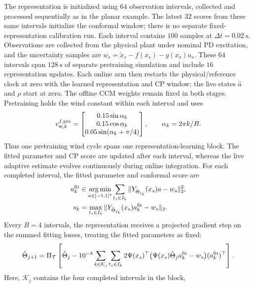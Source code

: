 \documentclass[11pt]{article}
\begin{document}
The representation is initialized using $64$ observation intervals,
collected and processed sequentially as in the planar example. The latest
$32$ scores from these same intervals initialize the conformal window;
there is no separate fixed-representation calibration run. Each interval contains $100$ samples at
$\Delta t=0.02~\mathrm s$. Observations are collected from the physical
plant under nominal PD excitation, and the uncertainty samples are
$w_s=\dot x_s-f(x_s)-g(x_s)u_s$.
These $64$ intervals span $128~\mathrm s$ of separate pretraining
simulation and include $16$ representation updates. Each online arm
then restarts the physical/reference clock at zero with the learned
representation and CP window; the live states $\hat a$ and $\rho$
start at zero. The offline CCM weights remain fixed in both stages.
Pretraining holds the wind constant within each interval and uses
\begin{equation}
    v_{{\rm w},k}^{I,\rm pre}=
      \begin{bmatrix}0.15\sin\alpha_k\\0.15\cos\alpha_k\\
      0.05\sin(\alpha_k+\pi/4)\end{bmatrix},\qquad
    \alpha_k=2\pi k/B.
\end{equation}
Thus one pretraining wind cycle spans one representation-learning block.
The fitted parameter and CP score are updated after each interval, whereas
the live adaptive estimate evolves continuously during online integration.
For each completed interval, the fitted parameter and conformal score are
\begin{equation}\label{eq:quad-score}
\begin{aligned}
    a_k^{\rm fit}&\in\underset{a\in[-1,1]^4}{\arg\min}
        \sum_{t_s\in I_k}\|Y_{\hat\Theta_{j_k}}(x_s)a-w_s\|_2^2,\\
    s_k&=\max_{t_s\in I_k}
        \|Y_{\hat\Theta_{j_k}}(x_s)a_k^{\rm fit}-w_s\|_2.
\end{aligned}
\end{equation}
Every $B=4$ intervals, the representation receives a projected gradient
step on the summed fitting losses, treating the fitted parameters as fixed:
\begin{equation}
    \hat\Theta_{j+1}=\Pi_{\mathcal T}\left[
      \hat\Theta_j-10^{-4}\sum_{k\in\mathcal K_j}\sum_{t_s\in I_k}
      2\Psi(x_s)^\top
      \big(\Psi(x_s)\hat\Theta_j a_k^{\rm fit}-w_s\big)
      (a_k^{\rm fit})^\top\right].
\end{equation}
Here, $\mathcal K_j$ contains the four completed intervals in the block,
\end{document}
